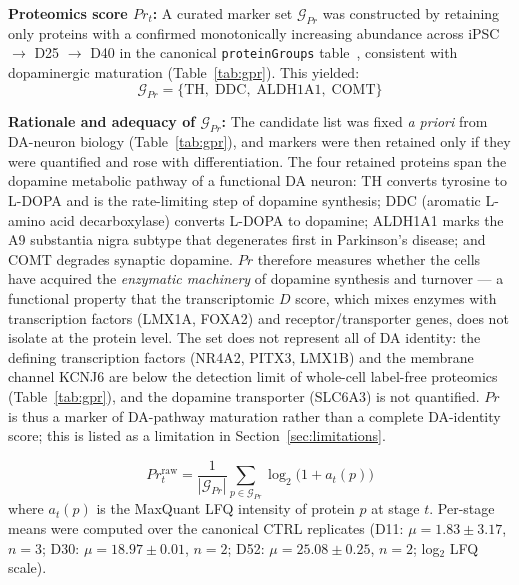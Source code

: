 \documentclass[5p,times,twocolumn]{elsarticle}
\newcommand{\rtag}[1]{}
\newenvironment{revblock}[1]{\par\rtag{#1}\ignorespaces}{\par}
\newcommand{\lang}[1]{#1}
\begin{document}
\textbf{Proteomics score $Pr_{t}$:}
A curated marker set $\mathcal{G}_{Pr}$ was constructed by
retaining only proteins with a confirmed monotonically
increasing abundance across iPSC $\to$ D25 $\to$ D40 in
the \lang{canonical \texttt{proteinGroups} table}~\cite{novak2022single}, consistent with
dopaminergic maturation (Table~\ref{tab:gpr}).
This yielded:
%
\begin{equation}
  \mathcal{G}_{Pr} =
    \{\text{TH},\;\text{DDC},\;\text{ALDH1A1},\;\text{COMT}\}
  \label{eq:gpr}
\end{equation}
%
\begin{revblock}{R2.2,R2.14}
  \textbf{Rationale and adequacy of $\mathcal{G}_{Pr}$:}
  The candidate list was fixed \textit{a priori} from DA-neuron
  biology (Table~\ref{tab:gpr}), and markers were then retained
  only if they were quantified and rose with differentiation.
  The four retained proteins span the dopamine metabolic
  pathway of a functional DA neuron:
  TH converts tyrosine to L-DOPA and is the rate-limiting step of
  dopamine synthesis;
  DDC (aromatic L-amino acid decarboxylase) converts L-DOPA to
  dopamine;
  ALDH1A1 marks the A9 substantia nigra subtype that degenerates
  first in Parkinson's disease;
  and COMT degrades synaptic dopamine.
  $Pr$ therefore measures whether the cells have acquired the
  \textit{enzymatic machinery} of dopamine synthesis and turnover
  --- a functional property that the transcriptomic $D$ score,
  which mixes enzymes with transcription factors (LMX1A, FOXA2)
  and receptor/transporter genes, does not isolate at the protein
  level.
  The set does not represent all of DA identity: the defining
  transcription factors (NR4A2, PITX3, LMX1B) and the membrane
  channel KCNJ6 are below the detection limit of whole-cell
  label-free proteomics (Table~\ref{tab:gpr}), and the dopamine
  transporter (SLC6A3) is not quantified. $Pr$ is thus a marker
  of DA-pathway maturation rather than a complete DA-identity
  score; this is listed as a limitation in
  Section~\ref{sec:limitations}.
\end{revblock}
%
\begin{equation}
  Pr_{t}^{\text{raw}} =
    \frac{1}{|\mathcal{G}_{Pr}|}
    \sum_{p \in \mathcal{G}_{Pr}} \log_{2}\!\bigl(1 + a_{t}(p)\bigr)
  \label{eq:Pr}
\end{equation}
%
where $a_{t}(p)$ is the MaxQuant LFQ intensity of protein $p$
at stage $t$.
Per-stage means were computed over the canonical CTRL
replicates (D11: $\mu = 1.83 \pm 3.17$, $n = 3$;
D30: $\mu = 18.97 \pm 0.01$, $n = 2$;
D52: $\mu = 25.08 \pm 0.25$, $n = 2$; log$_{2}$ LFQ scale).
\end{document}
